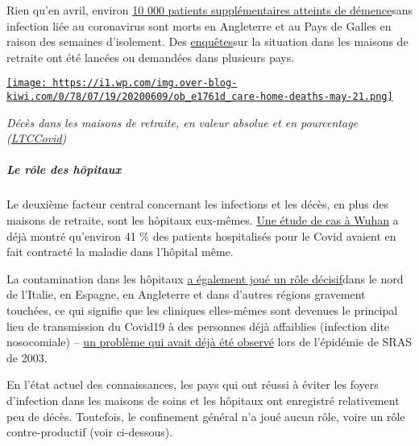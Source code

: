 Rien qu'en avril, environ
\href{https://www.theguardian.com/world/2020/jun/05/covid-19-causing-10000-dementia-deaths-beyond-infections-research-says}{10
000 patients supplémentaires atteints de démence}sans infection liée au
coronavirus sont morts en Angleterre et au Pays de Galles en raison des
semaines d'isolement. Des
\href{https://nypost.com/2020/05/12/calls-for-independent-probe-of-gov-cuomos-nursing-home-policies/}{enquêtes}sur
la situation dans les maisons de retraite ont été lancées ou demandées
dans plusieurs pays.

\href{http://img.over-blog-kiwi.com/0/78/07/19/20200609/ob_e1761d_care-home-deaths-may-21.png\#width=736\&height=443}{\texttt{[image: https://i1.wp.com/img.over-blog-kiwi.com/0/78/07/19/20200609/ob\_e1761d\_care-home-deaths-may-21.png]}}

\emph{Décès dans les maisons de retraite, en valeur absolue et en
pourcentage
(\href{https://ltccovid.org/2020/04/12/mortality-associated-with-covid-19-outbreaks-in-care-homes-early-international-evidence/}{LTCCovid})}

\hypertarget{le-ruxf4le-des-huxf4pitaux}{%
\subparagraph{\texorpdfstring{\textbf{Le rôle des
hôpitaux}}{Le rôle des hôpitaux}}\label{le-ruxf4le-des-huxf4pitaux}}

Le deuxième facteur central concernant les infections et les décès, en
plus des maisons de retraite, sont les hôpitaux eux-mêmes.
\href{https://jamanetwork.com/journals/jama/fullarticle/2761044}{Une
étude de cas à Wuhan} a déjà montré qu'environ 41 \% des patients
hospitalisés pour le Covid avaient en fait contracté la maladie dans
l'hôpital même.

La contamination dans les hôpitaux
\href{https://medium.com/\%40tepper_jonathan/ground-zero-when-the-cure-is-worse-than-the-disease-3c513d91393d}{a
également joué un rôle décisif}dans le nord de l'Italie, en Espagne, en
Angleterre et dans d'autres régions gravement touchées, ce qui signifie
que les cliniques elles-mêmes sont devenues le principal lieu de
transmission du Covid19 à des personnes déjà affaiblies (infection dite
nosocomiale) --
\href{https://onlinelibrary.wiley.com/doi/10.1046/j.1440-1843.2003.00523.x}{un
problème qui avait déjà été observé} lors de l'épidémie de SRAS de 2003.

En l'état actuel des connaissances, les pays qui ont réussi à éviter les
foyers d'infection dans les maisons de soins et les hôpitaux ont
enregistré relativement peu de décès. Toutefois, le confinement général
n'a joué aucun rôle, voire un rôle contre-productif (voir ci-dessous).

